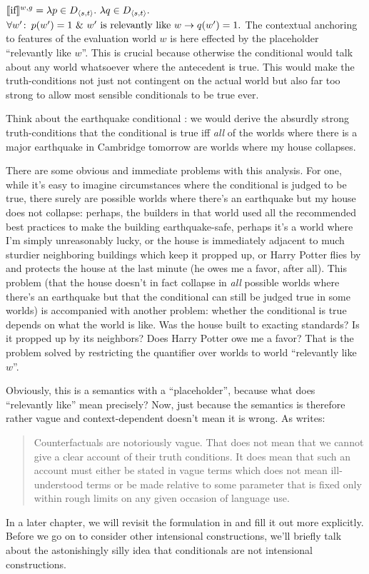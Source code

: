 \ex\label{ex:if-strict-context}%
$\llbracket \mbox{if} \rrbracket^{w,g} = \lambda p \in D_{\langle s,t \rangle}.\ \lambda q \in
D_{\langle s,t \rangle}.$ \\ \null\hfill $\forall w'\colon\thinspace p(w')=1\ \&\ w' \text{ is
  relevantly like } w \rightarrow q(w')=1.$ \xe
%
The contextual anchoring to features of the evaluation world $w$ is here
effected by the placeholder ``relevantly like $w$''. This is crucial because
otherwise the conditional would talk about any world whatsoever where the
antecedent is true. This would make the truth-conditions not just not contingent
on the actual world but also far too strong to allow most sensible conditionals
to be true ever.

Think about the earthquake conditional : we would derive the
absurdly strong truth-conditions that the conditional is true iff \emph{all} of
the worlds where there is a major earthquake in Cambridge tomorrow are worlds
where my house collapses.

There are some obvious and immediate problems with this analysis. For one, while
it's easy to imagine circumstances where the conditional  is
judged to be true, there surely are possible worlds where there's an earthquake
but my house does not collapse: perhaps, the builders in that world used all the
recommended best practices to make the building earthquake-safe, perhaps it's a
world where I'm simply unreasonably lucky, or the house is immediately adjacent
to much sturdier neighboring buildings which keep it propped up, or Harry Potter
flies by and protects the house at the last minute (he owes me a favor, after
all). This problem (that the house doesn't in fact collapse in \emph{all}
possible worlds where there's an earthquake but that the conditional can still
be judged true in some worlds) is accompanied with another problem: whether the
conditional is true depends on what the world is like. Was the house built to
exacting standards? Is it propped up by its neighbors? Does Harry Potter owe me
a favor? That is the problem solved by restricting the quantifier over worlds to
world ``relevantly like $w$''.

Obviously, this is a semantics with a ``placeholder'', because what does
``relevantly like'' mean precisely? Now, just because the semantics is therefore
rather vague and context-dependent doesn't mean it is wrong. As
\textcite{lewis:1973:counterfactuals} writes:

\begin{quote} Counterfactuals are notoriously vague. That does not mean that we
  cannot give a clear account of their truth conditions. It does mean that such
  an account must either be stated in vague terms \dash which does not mean
  ill-understood terms \dash or be made relative to some parameter that is fixed
  only within rough limits on any given occasion of language use.
\end{quote}
%
In a later chapter, we will revisit the formulation in
 and fill it out more explicitly. Before we go on to
consider other intensional constructions, we'll briefly talk about the
astonishingly silly idea that conditionals are not intensional constructions.
 
